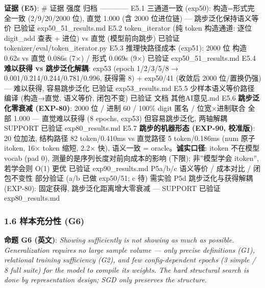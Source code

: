 \documentclass[
]{article}
\begin{document}
\textbf{证据 (E5)}: \textbar{} \# \textbar{} 证据 \textbar{} 强度
\textbar{} 归档 \textbar{}
\textbar---\textbar---\textbar---\textbar---\textbar{} \textbar{} E5.1
\textbar{} 三通道一致 (exp50): 构造=形式完全一致 (2/9/20/2000 位), 直觉
1.000 (含 2000 位进位链) --- 跳步泛化保持语义等价 \textbar{} 已验证
\textbar{} exp50\_51\_results.md \textbar{} \textbar{} E5.2 \textbar{}
token\_iterator (纯 token 构造通道: 逐位 digit\_add 查表 + 进位) vs 直觉
(模型前向跳步) \textbar{} 已验证 \textbar{}
tokenizer/eval/token\_iterator.py \textbar{} \textbar{} E5.3 \textbar{}
推理快路径成本 (exp51): 2000 位 构造 0.62s vs 直觉 0.086s (7×) / 形式
0.069s (9×) \textbar{} 已验证 \textbar{} exp50\_51\_results.md
\textbar{} \textbar{} E5.4 \textbar{} \textbf{难以获得 vs 跳步泛化解耦}:
exp53 (epoch 1/2/3/5/8 → 0.001/0.214/0.244/0.781/0.996, 获得需 8) +
exp50/41 (收敛后 2000 位/置换仍强) --- 难以获得, 容易跳步泛化 \textbar{}
已验证 \textbar{} exp53\_results.md \textbar{} \textbar{} E5.5
\textbar{} 少样本语义等价路径编译 (构造→直觉, 语义等价, 闭包不变)
\textbar{} 已验证 \textbar{} 文档 其他AI意见.md \textbar{} \textbar{}
E5.6 \textbar{} \textbf{跳步泛化零衰减 (EXP-80)}: 2000 位 / 进制 60 /
100\% digit 匿名 / 位宽×进制联合 全部 1.000 --- 直觉难以获得 (8 epochs,
exp53) 但容易跳步泛化, 两轴解耦 SUPPORT \textbar{} 已验证 \textbar{}
exp80\_results.md \textbar{} \textbar{} E5.7 \textbar{}
\textbf{跳步的机器形态 (EXP-90, 校准版)}: 20 位加法, 结构路径 82
token/0.410ms vs 直觉路径 5 token/0.186ms (num 原子 itoken, 16× token
缩短, 2.2× 快), 语义一致 = oracle。\textbf{诚实口径}: itoken 不在模型
vocab (pad 0), 测量的是序列长度对前向成本的影响 (下限); 非''模型学会
itoken'', 若学会则 O(1) 更优 \textbar{} 已验证 \textbar{}
exp90\_results.md \textbar{} \textbar{} P5a/b/c \textbar{} 语义等价 /
成本对比 / 闭包不变性 \textbar{} 部分验证 (a/b 已做 exp50/51; c 待)
\textbar{} 需实验 \textbar{} \textbar{} P5d \textbar{}
跳步泛化与获得解耦 (EXP-80): 固定获得, 跳步泛化距离增大零衰减 ---
SUPPORT \textbar{} 已验证 \textbar{} exp80\_results.md \textbar{}

\subsubsection{1.6 样本充分性
(G6)}\label{ux6837ux672cux5145ux5206ux6027-g6}

\textbf{命题 G6 (英文)}: \emph{Showing sufficiently is not showing as
much as possible. Generalization requires no large sample volume ---
only precise definitions (G1), relational training sufficiency (G2), and
few config-dependent epochs (3 simple / 8 full suite) for the model to
compile its weights. The hard structural search is done by
representation design; SGD only preserves the structure.}
\end{document}
